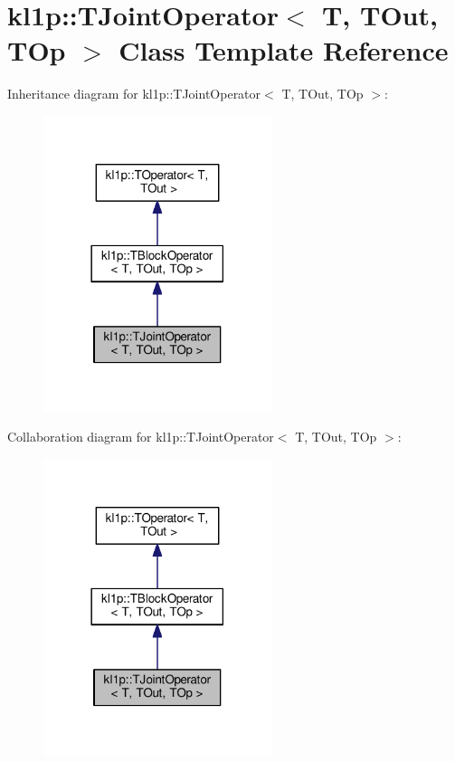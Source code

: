 \hypertarget{classkl1p_1_1TJointOperator}{}\section{kl1p\+:\+:T\+Joint\+Operator$<$ T, T\+Out, T\+Op $>$ Class Template Reference}
\label{classkl1p_1_1TJointOperator}


Inheritance diagram for kl1p\+:\+:T\+Joint\+Operator$<$ T, T\+Out, T\+Op $>$\+:
\nopagebreak
\begin{figure}[H]
\begin{center}
\leavevmode
\includegraphics[width=189pt]{classkl1p_1_1TJointOperator__inherit__graph}
\end{center}
\end{figure}


Collaboration diagram for kl1p\+:\+:T\+Joint\+Operator$<$ T, T\+Out, T\+Op $>$\+:
\nopagebreak
\begin{figure}[H]
\begin{center}
\leavevmode
\includegraphics[width=189pt]{classkl1p_1_1TJointOperator__coll__graph}
\end{center}
\end{figure}
